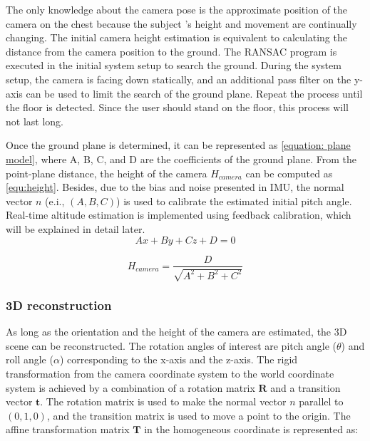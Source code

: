 \documentclass{ieeeaccess}
\begin{document}
The only knowledge about the camera pose is the approximate position of the camera on the chest because the subject ’s height and movement are continually changing. The initial camera height estimation is equivalent to calculating the distance from the camera position to the ground. The RANSAC program is executed in the initial system setup to search the ground. During the system setup, the camera is facing down statically, and an additional pass filter on the y-axis can be used to limit the search of the ground plane. Repeat the process until the floor is detected. Since the user should stand on the floor, this process will not last long.

Once the ground plane is determined, it can be represented as \eqref {equation: plane model}, where A, B, C, and D are the coefficients of the ground plane. From the point-plane distance, the height of the camera $H_{camera}$ can be computed as \eqref{equ:height}. Besides, due to the bias and noise presented in IMU, the normal vector $n$ (e.i., $(A, B, C)$) is used to calibrate the estimated initial pitch angle. Real-time altitude estimation is implemented using feedback calibration, which will be explained in detail later.
 \begin{equation}
Ax + By + Cz + D = 0 
\label{equation: plane model}
\end{equation}

\begin{equation}
H_{camera}=\frac{D}{\sqrt{A^2+B^2+C^2}}
\label{equ:height}
\end{equation}


\subsubsection{3D reconstruction} 
As long as the orientation and the height of the camera are estimated, the 3D scene can be reconstructed. The rotation angles of interest are pitch angle ($\theta$) and roll angle ($\alpha$) corresponding to the x-axis and the z-axis. The rigid transformation from the camera coordinate system to the world coordinate system is achieved by a combination of a rotation matrix $\textbf{R}$ and a transition vector $\textbf{t}$.  The rotation matrix is used to make the normal vector $n$ parallel to $(0, 1, 0)$, and the transition matrix is used to move a point to the origin. The affine transformation matrix $\textbf{T}$ in the homogeneous coordinate is represented as:
\end{document}
